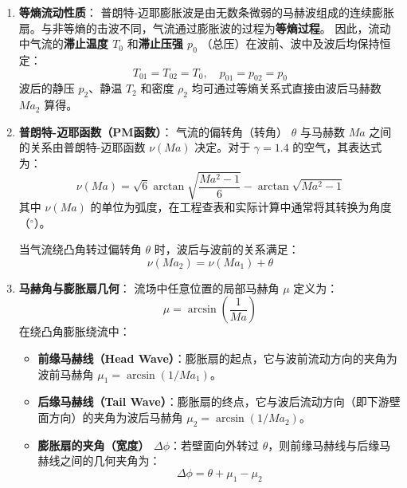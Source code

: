 \documentclass[11pt,a4paper]{ctexart}
\begin{document}
\begin{enumerate}
    \item \textbf{等熵流动性质}：
    普朗特-迈耶膨胀波是由无数条微弱的马赫波组成的连续膨胀扇。与非等熵的击波不同，气流通过膨胀波的过程为\textbf{等熵过程}。
    因此，流动中气流的\textbf{滞止温度 $T_0$} 和\textbf{滞止压强 $p_0$} （总压）在波前、波中及波后均保持恒定：
    \begin{equation}
        T_{01} = T_{02} = T_0, \quad p_{01} = p_{02} = p_0
    \end{equation}
    波后的静压 $p_2$、静温 $T_2$ 和密度 $\rho_2$ 均可通过等熵关系式直接由波后马赫数 $Ma_2$ 算得。

    \item \textbf{普朗特-迈耶函数（PM函数）}：
    气流的偏转角（转角） $\theta$ 与马赫数 $Ma$ 之间的关系由普朗特-迈耶函数 $\nu(Ma)$ 决定。对于 $\gamma = 1.4$ 的空气，其表达式为：
    \begin{equation}
        \nu(Ma) = \sqrt{6} \arctan \sqrt{\frac{Ma^2 - 1}{6}} - \arctan \sqrt{Ma^2 - 1}
    \end{equation}
    其中 $\nu(Ma)$ 的单位为弧度，在工程查表和实际计算中通常将其转换为角度（$^\circ$）。
    
    当气流绕凸角转过偏转角 $\theta$ 时，波后与波前的关系满足：
    \begin{equation}
        \nu(Ma_2) = \nu(Ma_1) + \theta
    \end{equation}

    \item \textbf{马赫角与膨胀扇几何}：
    流场中任意位置的局部马赫角 $\mu$ 定义为：
    \begin{equation}
        \mu = \arcsin\left(\frac{1}{Ma}\right)
    \end{equation}
    在绕凸角膨胀绕流中：
    \begin{itemize}
        \item \textbf{前缘马赫线（Head Wave）}：膨胀扇的起点，它与波前流动方向的夹角为波前马赫角 $\mu_1 = \arcsin(1/Ma_1)$。
        \item \textbf{后缘马赫线（Tail Wave）}：膨胀扇的终点，它与波后流动方向（即下游壁面方向）的夹角为波后马赫角 $\mu_2 = \arcsin(1/Ma_2)$。
        \item \textbf{膨胀扇的夹角（宽度） $\Delta \phi$}：若壁面向外转过 $\theta$，则前缘马赫线与后缘马赫线之间的几何夹角为：
        \begin{equation}
            \Delta \phi = \theta + \mu_1 - \mu_2
        \end{equation}
    \end{itemize}
\end{enumerate}
\end{document}
